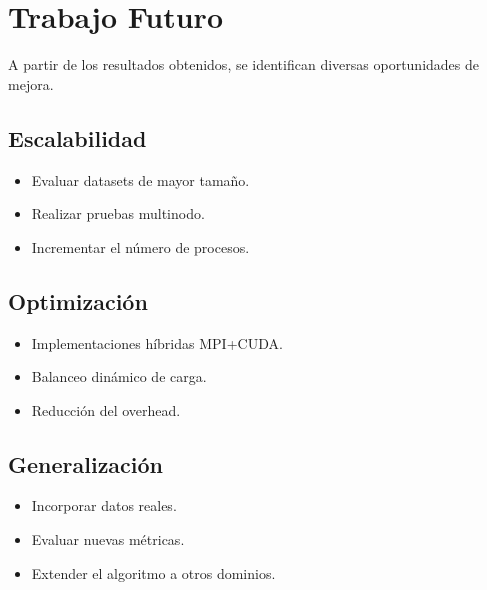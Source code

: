 \chapter{Trabajo Futuro}

A partir de los resultados obtenidos, se identifican diversas oportunidades de mejora.

\section{Escalabilidad}

\begin{itemize}
    \item Evaluar datasets de mayor tamaño.
    \item Realizar pruebas multinodo.
    \item Incrementar el número de procesos.
\end{itemize}

\section{Optimización}

\begin{itemize}
    \item Implementaciones híbridas MPI+CUDA.
    \item Balanceo dinámico de carga.
    \item Reducción del overhead.
\end{itemize}

\section{Generalización}

\begin{itemize}
    \item Incorporar datos reales.
    \item Evaluar nuevas métricas.
    \item Extender el algoritmo a otros dominios.
\end{itemize}